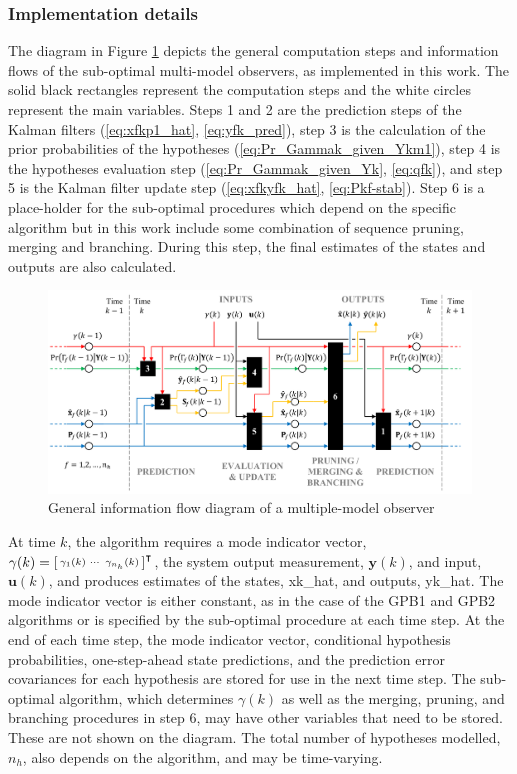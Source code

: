 \subsubsection{Implementation details} \label{subsec-implementation}

The diagram in Figure \ref{fig:mkf-infoflow} depicts the general computation steps and information flows of the sub-optimal multi-model observers, as implemented in this work. The solid black rectangles represent the computation steps and the white circles represent the main variables. Steps 1 and 2 are the prediction steps of the Kalman filters (\ref{eq:xfkp1_hat}, \ref{eq:yfk_pred}), step 3 is the calculation of the prior probabilities of the hypotheses (\ref{eq:Pr_Gammak_given_Ykm1}), step 4 is the hypotheses evaluation step (\ref{eq:Pr_Gammak_given_Yk}, \ref{eq:qfk}), and step 5 is the Kalman filter update step (\ref{eq:xfkyfk_hat}, \ref{eq:Pkf-stab}). Step 6 is a place-holder for the sub-optimal procedures which depend on the specific algorithm but in this work include some combination of sequence pruning, merging and branching. During this step, the final estimates of the states and outputs are also calculated.

\begin{figure}[htp]
	\centering
	\includegraphics[width=15.5cm]{images/mkf_infoflow.pdf}
	\caption{General information flow diagram of a multiple-model observer}
	\label{fig:mkf-infoflow}
\end{figure}

At time $k$, the algorithm requires a mode indicator vector, $\gamma(k)=\begin{bsmallmatrix} \gamma_1(k) & \cdots & \gamma_{n_h}(k) \end{bsmallmatrix}^\intercal$, the system output measurement, $\mathbf{y}(k)$, and input, $\mathbf{u}(k)$, and produces estimates of the states, \gls{xk_hat}, and outputs, \gls{yk_hat}. The mode indicator vector is either constant, as in the case of the \gls{GPB1} and \gls{GPB2} algorithms or is specified by the sub-optimal procedure at each time step. At the end of each time step, the mode indicator vector, conditional hypothesis probabilities, one-step-ahead state predictions, and the prediction error covariances for each hypothesis are stored for use in the next time step. The sub-optimal algorithm, which determines $\gamma(k)$ as well as the merging, pruning, and branching procedures in step 6, may have other variables that need to be stored. These are not shown on the diagram. The total number of hypotheses modelled, $n_h$, also depends on the algorithm, and may be time-varying.

